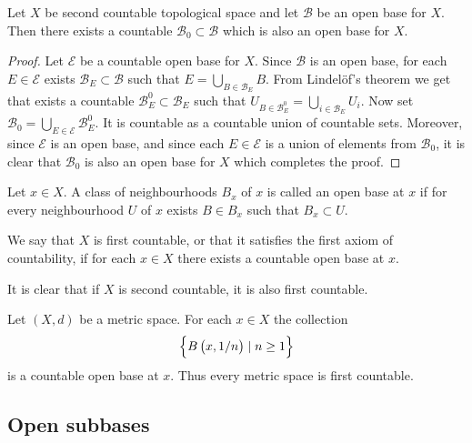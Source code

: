 \documentclass[11pt,a4paper]{article}
\begin{document}
\begin{corollary}
  Let $X$ be second countable topological space
  and let $\mathcal{B}$ be an open base for $X$.
  Then there exists a countable $\mathcal{B}_0 \subset \mathcal{B}$ 
  which is also an open base for $X$.
\end{corollary}
\begin{proof}
  Let $\mathcal{E}$ be a countable open base for $X$. Since $\mathcal{B}$
  is an open base, for each $E \in \mathcal{E}$ exists 
  $\mathcal{B}_E \subset \mathcal{B}$ such that 
  $E = \bigcup_{B \in \mathcal{B}_E} B$. From Lindel\"of's theorem
  we get that exists a countable $\mathcal{B}^0_E \subset \mathcal{B}_E$
  such that $U_{B \in \mathcal{B}^0_E} = \bigcup_{i \in \mathcal{B}_E}{U_i}$.
  Now set $\mathcal{B}_0 = \bigcup_{E \in \mathcal{E}}{\mathcal{B}^0_E}$.
  It is countable as a countable union of countable sets. Moreover,
  since $\mathcal{E}$ is an open base, and since each $E \in \mathcal{E}$
  is a union of elements from $\mathcal{B}_0$, it is clear that
  $\mathcal{B}_0$ is also an open base for $X$ which completes the proof.
\end{proof}

\begin{definition}
  Let $x \in X$. A class of neighbourhoods $B_x$ of $x$ is called an open
  base at $x$ if for every neighbourhood $U$ of $x$ exists $B \in B_x$
  such that $B_x \subset U$.
\end{definition}

\begin{definition}
  We say that $X$ is first countable, or that it satisfies the first
  axiom of countability, if for each $x \in X$ there exists a countable 
  open base at $x$.
\end{definition}

\begin{remark}
  It is clear that if $X$ is second countable, it is also first countable.
\end{remark}

\begin{example}
  Let $(X, d)$ be a metric space. For each $x \in X$ the collection
  \[
    \set{B\del{x, 1/n} \mid n \geq 1}
  \]
  is a countable open base at $x$. 
  Thus every metric space is first countable.
\end{example}

\subsection{Open subbases}
\end{document}
